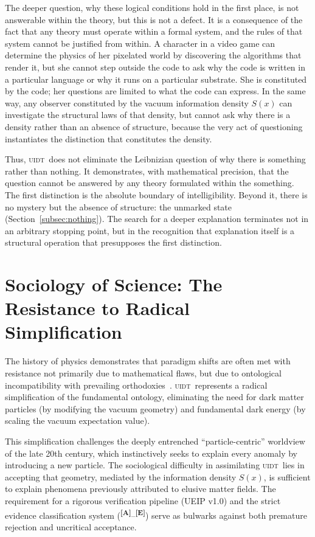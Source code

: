 \documentclass[12pt,a4paper,twoside]{article}
\theoremstyle{plain}
\theoremstyle{definition}
\theoremstyle{remark}
\newcommand{\UIDT}{\textsc{uidt}}
\newcommand{\catmark}[1]{\textsuperscript{\textsf{\textbf{[#1]}}}}
\newcommand{\Sx}{S(x)}
\begin{document}
The deeper question, why these logical conditions hold in the first place, is
not answerable within the theory, but this is not a defect. It is a
consequence of the fact that any theory must operate within a formal system,
and the rules of that system cannot be justified from within. A character in a
video game can determine the physics of her pixelated world by discovering the
algorithms that render it, but she cannot step outside the code to ask why the
code is written in a particular language or why it runs on a particular
substrate. She is constituted by the code; her questions are limited to what
the code can express. In the same way, any observer constituted by the vacuum
information density $S(x)$ can investigate the structural laws of that density,
but cannot ask why there is a density rather than an absence of structure,
because the very act of questioning instantiates the distinction that
constitutes the density.

Thus, \UIDT\ does not eliminate the Leibnizian question of why there is
something rather than nothing. It demonstrates, with mathematical precision,
that the question cannot be answered by any theory formulated within the
something. The first distinction is the absolute boundary of intelligibility.
Beyond it, there is no mystery but the absence of structure: the unmarked
state (Section~\ref{subsec:nothing}). The search for a deeper explanation
terminates not in an arbitrary stopping point, but in the recognition that
explanation itself is a structural operation that presupposes the first
distinction.

\section{Sociology of Science: The Resistance to Radical Simplification}
\label{sec:sociology}

The history of physics demonstrates that paradigm shifts are often met with
resistance not primarily due to mathematical flaws, but due to ontological
incompatibility with prevailing orthodoxies~\cite{Kuhn1962}. \UIDT\ represents
a radical simplification of the fundamental ontology, eliminating the need for
dark matter particles (by modifying the vacuum geometry) and fundamental dark
energy (by scaling the vacuum expectation value).

This simplification challenges the deeply entrenched ``particle-centric''
worldview of the late 20th century, which instinctively seeks to explain every
anomaly by introducing a new particle. The sociological difficulty in
assimilating \UIDT\ lies in accepting that geometry, mediated by the
information density $\Sx$, is sufficient to explain phenomena previously
attributed to elusive matter fields. The requirement for a rigorous verification
pipeline (UEIP v1.0) and the strict evidence classification system
(\catmark{A}--\catmark{E}) serve as bulwarks against both premature
rejection and uncritical acceptance.
\end{document}
